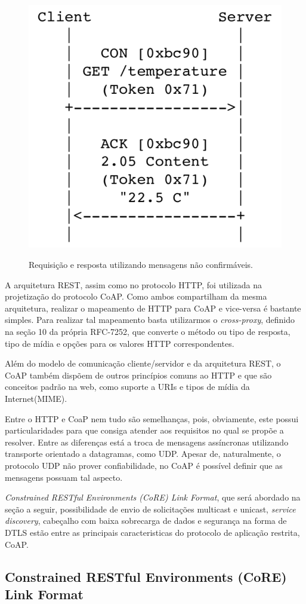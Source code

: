 \begin{figure}[htb!]
    \centering\includegraphics[height=.4\textwidth]{fig4.png} 
    \caption [Requisição e resposta utilizando mensagens não confirmáveis]
    {\label{fig:fig4} Requisição e resposta utilizando mensagens não confirmáveis.} \cite{rfc7252}
\end{figure}

A arquitetura REST, assim como no protocolo HTTP\cite{rfc2616}, foi utilizada na projetização do protocolo CoAP.
Como ambos compartilham da mesma arquitetura, realizar o mapeamento de HTTP para CoAP e vice-versa é bastante simples.
Para realizar tal mapeamento basta utilizarmos o \textit{cross-proxy}, definido na seção 10 da própria RFC-7252\cite{rfc7252},
que converte o método ou tipo de resposta, tipo de mídia e opções para os valores HTTP correspondentes.

Além do modelo de comunicação cliente/servidor e da arquitetura REST, o CoAP também dispõem de outros princípios comuns ao HTTP e que são conceitos padrão na web,
como suporte a URIs\cite{rfc3986} e tipos de mídia da Internet(MIME)\cite{rfc2046}.

Entre o HTTP e CoaP nem tudo são semelhanças, pois, obviamente, este possui particularidades para que consiga atender aos requisitos no qual se propõe a resolver.
Entre as diferenças está a troca de mensagens assíncronas utilizando transporte orientado a datagramas, como UDP.
Apesar de, naturalmente, o protocolo UDP não prover confiabilidade, no CoAP é possível definir que as mensagens possuam tal aspecto.

\textit{Constrained RESTful Environments (CoRE) Link Format}, que será abordado na seção a seguir, possibilidade de envio de solicitações multicast e unicast, \textit{service discovery}, cabeçalho com baixa sobrecarga de dados e segurança na forma de DTLS\cite{rfc6347}
estão entre as principais caracteristicas do protocolo de aplicação restrita, CoAP.

\subsection{Constrained RESTful Environments (CoRE) Link Format}

